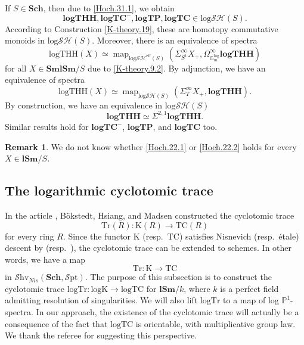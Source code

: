 \documentclass[11pt, a4paper]{amsart}
\theoremstyle{definition}
\newtheorem{rmk}[thm]{Remark}
\numberwithin{equation}{subsection}
\renewcommand{\P}{\mathbb{P}}
\newcommand{\Sch}{\mathbf{Sch}}
\newcommand{\lSm}{\mathbf{lSm}}
\newcommand{\SmlSm}{\mathbf{SmlSm}}
\newcommand{\TC}{\mathrm{TC}}
\newcommand{\Tr}{\mathrm{Tr}}
\newcommand{\Kth}{\mathrm{K}}
\newcommand{\logTHH}{\mathrm{logTHH}}
\newcommand{\spectlogTHH}{\mathbf{logTHH}}
\newcommand{\logTC}{\mathrm{logTC}}
\newcommand{\logTr}{\mathrm{logTr}}
\newcommand{\spectlogTC}{\mathbf{logTC}}
\newcommand{\spectlogTP}{\mathbf{logTP}}
\newcommand{\Kthlog}{\mathrm{logK}}
\newcommand{\Gmm}{\mathbb{G}_m^{\mathrm{log}}}
\newcommand{\infShv}{\mathcal{S}\mathrm{hv}}
\newcommand{\infSpt}{\mathcal{S}\mathrm{pt}}
\newcommand{\inflogSH}{\mathrm{log}\mathcal{SH}}
\newcommand{\inflogSHS}{\mathrm{log}\mathcal{SH}^{\mathrm{eff}}}
\newcommand{\map}{\operatorname{map}}
\begin{document}
If $S\in \Sch$, 
then due to \eqref{Hoch.31.1}, 
we obtain
\begin{equation}
\label{Hoch.22.3}
\spectlogTHH,\spectlogTC^-,\spectlogTP,\spectlogTC
\in
\inflogSH(S).
\end{equation}
According to Construction \ref{K-theory.19}, 
these are homotopy commutative monoids in $\inflogSH(S)$.
Moreover, 
there is an equivalence of spectra
\begin{equation}
\label{Hoch.22.1}
\logTHH(X)
\simeq
\map_{\inflogSHS(S)}(\Sigma_{S^1}^\infty X_+,\Omega_{\Gmm}^\infty \spectlogTHH)
\end{equation}
for all $X\in \SmlSm/S$ due to \eqref{K-theory.9.2}.
By adjunction, 
we have an equivalence of spectra
\begin{equation}
\label{Hoch.22.2}
\logTHH(X)
\simeq
\map_{\inflogSH(S)}(\Sigma_T^\infty X_+,\spectlogTHH).
\end{equation}
By construction, we have an equivalence in $\inflogSH(S)$
\begin{equation}
\label{Hoch.22.4}
\spectlogTHH
\simeq
\Sigma^{2,1}\spectlogTHH.
\end{equation}
Similar results hold for $\spectlogTC^-$, $\spectlogTP$, and $\spectlogTC$ too.

\begin{rmk}
We do not know whether \eqref{Hoch.22.1} or \eqref{Hoch.22.2} holds for every $X\in \lSm/S$.
\end{rmk}



\subsection{The logarithmic cyclotomic trace}
\label{subsection:logtrace}

In the article \cite{zbMATH00203552}, 
B\"okstedt, Hsiang, and Madsen constructed the 
cyclotomic trace\index[notation]{Tr @ $\Tr$}
\[
\Tr(R)
\colon
\Kth(R) \to \TC(R)
\]
for every ring $R$.
Since the functor $\Kth$ (resp.\ $\TC$) satisfies Nisnevich (resp.\ \'etale) descent by 
\cite[Theorem 10.8]{TT} (resp.\ \cite[Corollary 3.3.3]{zbMATH01421292}), 
the cyclotomic trace can be extended to schemes.
In other words, we have a map
\begin{equation}
\label{trace.0.1}
\Tr
\colon
\Kth\to \TC
\end{equation}
in $\infShv_{Nis}(\Sch,\infSpt)$.
The purpose of this subsection is to construct the cyclotomic trace $\logTr\colon \Kthlog \to \logTC$ for $\lSm/k$, 
where $k$ is a perfect field admitting resolution of singularities.
We will also lift $\logTr$ to a map of log $\P^1$-spectra. In our approach, the existence of the cyclotomic trace will actually be a consequence of the fact that $\logTC$ is orientable, with multiplicative group law. We thank the referee for suggesting this perspective.
\end{document}
